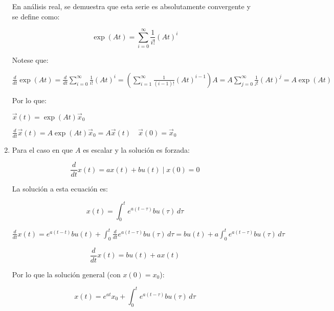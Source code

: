 \documentclass[12pt]{article}
\numberwithin{equation}{subsection}
\begin{document}
\begin{enumerate}
En análisis real, se demuestra que esta serie es absolutamente convergente y se define como:

\begin{equation}
\exp{(At)} = \sum\limits_{i = 0}^{\infty} \frac{1}{i!} (A t)^i
\end{equation}

Notese que:

\begin{math}
\frac{d}{dt} \exp{(At)} = \frac{d}{dt} \sum\limits_{i=0}^{\infty} \frac{1}{i!} (At)^i = \left( \sum\limits_{i=1}^{\infty} \frac{1}{(i-1)!} (At)^{i-1} \right) A = A \sum\limits_{j=0}^{\infty} \frac{1}{j!} (At)^j = A \exp{(At)}
\end{math}

Por lo que:

\begin{math}
\vec{x}(t) = \exp{(At)} \vec{x}_0
\end{math}

\begin{math}
\frac{d}{dt} \vec{x}(t) = A \exp{(At)} \vec{x}_0 = A \vec{x}(t) \quad \vec{x}(0) = \vec{x}_0
\end{math}

\item
Para el caso en que $A$ es escalar y la solución es forzada:

\begin{equation}
\frac{d}{dt} x(t) = a x(t) + b u(t) \mid x(0) = 0
\end{equation}

La solución a esta ecuación es:

\begin{equation}
x(t) = \int_0^t e^{a(t-\tau)} b u(\tau) \, d \tau
\end{equation}

\begin{math}
\frac{d}{dt} x(t) = e^{a(t-t)} b u(t) + \int_0^t \frac{d}{dt} e^{a(t-\tau)} b u(\tau) \, d \tau = b u(t) + a \int_0^t e^{a(t-\tau)} b u(\tau) \, d \tau
\end{math}

\begin{equation}
\frac{d}{dt} x(t) = b u(t) + a x(t)
\end{equation}

Por lo que la solución general (con $x(0) = x_0$):

\begin{equation}
x(t) = e^{at} x_0 + \int_0^t e^{a(t-\tau)} b u(\tau) \, d \tau
\end{equation}


\end{enumerate}
\end{document}
